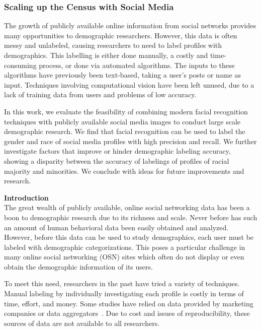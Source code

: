 \subsubsection{Scaling up the Census with Social Media}

The growth of publicly available online information from social networks provides many opportunities to demographic researchers.
However, this data is often messy and unlabeled, causing researchers to need to label profiles with demographics.
This labelling is either done manually, a costly and time-consuming process, or done via automated algorithms.
The inputs to these algorithms have previously been text-based, taking a user's posts or name as input.
Techniques involving computational vision have been left unused, due to a lack of training data from users and problems of low accuracy.

In this work, we evaluate the feasibility of combining modern facial recognition techniques with publicly available social media images to conduct large scale demographic research.
We find that facial recognition can be used to label the gender and race of social media profiles with high precision and recall.
We further investigate factors that improve or hinder demographic labeling accuracy, showing a disparity between the accuracy of labelings of profiles of racial majority and minorities.
We conclude with ideas for future improvements and research.


\textbf{Introduction} \\
The great wealth of publicly available, online social networking data has been a boon to demographic research due to its richness and scale.
Never before has such an amount of human behavioral data been easily obtained and analyzed.
However, before this data can be used to study demographics, each user must be labeled with demographic categorizations. 
This poses a particular challenge in many online social networking (OSN) sites which often do not display or even obtain the demographic information of its users.

To meet this need, researchers in the past have tried a variety of techniques.
Manual labeling by individually investigating each profile is costly in terms of time, effort, and money.
Some studies have relied on data provided by marketing companies or data aggregators~\cite{Goel:2012ut, biinferring}.
Due to cost and issues of reproducibility, these sources of data are not available to all researchers.

